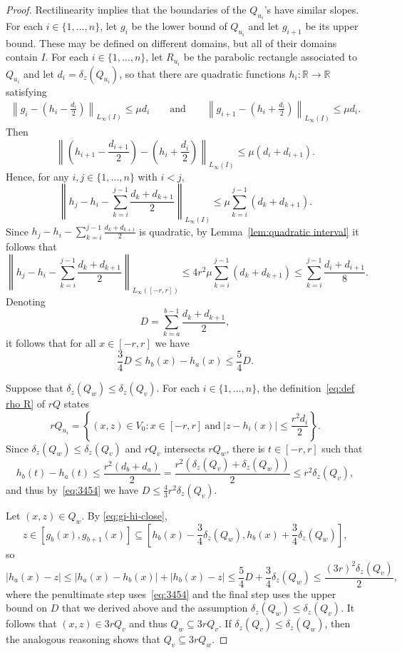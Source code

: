 \documentclass[11pt,reqno]{amsart}
\newcommand{\R}{\mathbb{R}}
\newcommand{\0}{\mathbf{0}}
\renewcommand{\1}{\mathbf 1}
\newcommand{\from}{\colon}
\renewcommand{\mid}{:}
\renewcommand{\subset}{\subseteq}
\renewcommand{\le}{\leqslant}
\newcommand{\n}{\{1,\ldots,n\}}
\theoremstyle{remark}
\begin{document}
\begin{proof}
  Rectilinearity implies that the boundaries of the $Q_{u_i}$'s have similar slopes.  For each $i\in \n$, let $g_i$ be the lower bound of $Q_{u_i}$ and let $g_{i+1}$ be its upper bound.  These may be defined on different domains, but all of their domains contain $I$.  For each $i\in \n$, let $R_{u_i}$ be the parabolic rectangle associated to $Q_{u_i}$ and let  $d_i=\delta_z(Q_{u_i})$, so that there are quadratic functions $h_i\from \R\to \R$ satisfying
  \begin{align*}\label{eq:choice of dh}
    \left\|g_i-\left(h_i-\frac{d_i}{2}\right)\right\|_{L_\infty(I)}  \le \mu d_i\qquad\mathrm{and}\qquad     \left\|g_{i+1}-\left(h_i+\frac{d_i}{2}\right)\right\|_{L_\infty(I)}  \le \mu d_i.
  \end{align*}
   Then
  \begin{equation}\label{eq:gi-hi-close}
    \left\|\left(h_{i+1} - \frac{d_{i+1}}{2}\right) - \left(h_{i} + \frac{d_i}{2}\right)\right\|_{L_\infty(I)}  \le \mu(d_i+d_{i+1}).
  \end{equation}
 Hence,  for any $i,j\in \n$ with $i<j$,
  $$\left\|h_{j}-h_i-\sum_{k=i}^{j-1} \frac{d_k+d_{k+1}}{2}\right\|_{L_\infty(I)}\le \mu \sum_{k=i}^{j-1} (d_k+d_{k+1}).$$
  Since $h_{j}-h_i-\sum_{k=i}^{j-1} \frac{d_k+d_{k+1}}{2}$  is  quadratic, by Lemma~\ref{lem:quadratic interval} it follows that
  $$\left\|h_{j}-h_i-\sum_{k=i}^{j-1} \frac{d_k+d_{k+1}}{2}\right\|_{L_\infty([-r,r])} \le 4r^2 \mu \sum_{k=i}^{j-1} (d_k+d_{k+1}) \le \sum_{k=i}^{j-1} \frac{d_i+d_{i+1}}{8}.$$
Denoting
  $$D=\sum_{k=a}^{b-1} \frac{d_k+d_{k+1}}{2},$$
 it follows that for all $x\in [-r,r]$ we have
 \begin{equation}\label{eq:3454}
 \frac{3}{4}D\le h_b(x)-h_a(x)\le \frac{5}{4}D.
 \end{equation}

Suppose that  $\delta_z(Q_w)\le \delta_z(Q_v)$.  For each $i\in\n$, the definition~\eqref{eq:def rho R} of $r Q$ states
  $$r Q_{u_i}=\left \{(x,z)\in V_0\mid x\in [-r,r]\ \mathrm{and}\  |z-h_i(x)|\le \frac{r^2 d_i}{2}\right\}.$$
  Since $\delta_z(Q_w)\le \delta_z(Q_v)$ and  $rQ_v$ intersects $rQ_w$, there is  $t\in [-r,r]$ such that
  $$h_b(t) - h_a(t) \le \frac{r^2(d_b+d_a)}{2} = \frac{r^2(\delta_z(Q_v)+\delta_z(Q_w))}{2}\le r^2\delta_z(Q_v),$$
  and thus by~\eqref{eq:3454} we have $D\le \frac43r^2\delta_z(Q_v)$.

  Let $(x,z)\in Q_w$. By \eqref{eq:gi-hi-close},
  $$z\in [g_b(x),g_{b+1}(x)]\subset \left[h_b(x)-\frac{3}{4}\delta_z(Q_w), h_b(x)+\frac{3}{4}\delta_z(Q_w)\right],$$
  so
  \begin{equation*}
    |h_a(x) - z|
    \le |h_a(x)-h_b(x)|+|h_b(x)-z|
    \le \frac{5}{4} D + \frac{3}{4}\delta_z(Q_w)
  \le \frac{(3r)^2 \delta_z(Q_v)}{2},
  \end{equation*}
  where the penultimate step uses~\eqref{eq:3454} and the final step uses the upper bound on $D$ that we derived above and the assumption $\delta_z(Q_w)\le \delta_z(Q_v)$. It follows that $(x,z)\in 3rQ_v$ and thus $Q_w\subset 3rQ_v$. If   $\delta_z(Q_v)\le \delta_z(Q_w)$, then the analogous reasoning shows that $Q_v\subset 3rQ_w$.
\end{proof}
\end{document}
